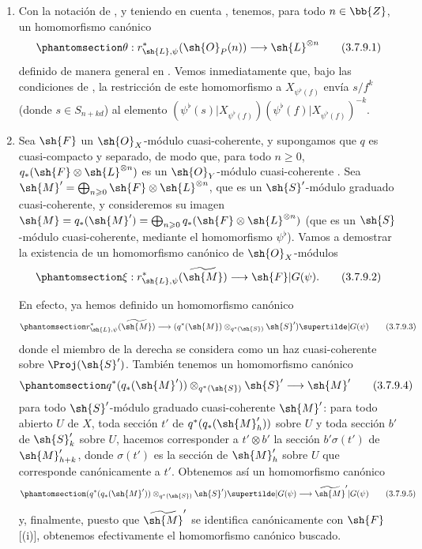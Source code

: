\documentclass[oneside,10pt]{amsart}
\makeatletter
\renewcommand{\geq}{\geqslant}
\newcommand{\ega@arrow}[2]{\mathchoice{#1}{#2}{#2}{#2}}
\renewcommand{\to}{\ega@arrow{\longrightarrow}{\rightarrow}}
\let\EGAOriginalLabel\label
\renewcommand{\label}[1]{\phantomsection\EGAOriginalLabel{#1}}
\makeatother
\begin{document}
\begin{remarks}[3.7.9]
\label{II.3.7.9}
\medskip\noindent
\begin{enumerate}
  \item[(i)] Con la notación de , y teniendo en cuenta , tenemos, para todo $n\in\bb{Z}$, un homomorfismo canónico
    \[
    \label{II.3.7.9.1}
      \theta : r_{\sh{L},\psi}^*(\sh{O}_P(n)) \to \sh{L}^{\otimes n}
    \tag{3.7.9.1}
    \]
    definido de manera general en .
    Vemos inmediatamente que, bajo las condiciones de , la restricción de este homomorfismo a $X_{\psi^\flat(f)}$ envía $s/f^k$ (donde $s\in S_{n+kd}$) al elemento $(\psi^\flat(s)|X_{\psi^\flat(f)})(\psi^\flat(f)|X_{\psi^\flat(f)})^{-k}$.
  \item[(ii)] Sea $\sh{F}$ un $\sh{O}_X$-módulo cuasi-coherente, y supongamos que $q$ es cuasi-compacto y separado, de modo que, para todo $n\geq0$, $q_*(\sh{F}\otimes\sh{L}^{\otimes n})$ es un $\sh{O}_Y$-módulo cuasi-coherente .
    Sea $\sh{M}'=\bigoplus_{n\geq0}\sh{F}\otimes\sh{L}^{\otimes n}$, que es un $\sh{S}'$-módulo graduado cuasi-coherente, y consideremos su imagen $\sh{M}=q_*(\sh{M}')=\bigoplus_{n\geq0}q_*(\sh{F}\otimes\sh{L}^{\otimes n})$ (que es un $\sh{S}$-módulo cuasi-coherente, mediante el homomorfismo $\psi^\flat$).
    Vamos a demostrar la existencia de un homomorfismo canónico de $\sh{O}_X$-módulos
    \[
    \label{II.3.7.9.2}
      \xi : r_{\sh{L},\psi}^*(\widetilde{\sh{M}}) \to \sh{F}|G(\psi).
    \tag{3.7.9.2}
    \]

    En efecto, ya hemos definido  un homomorfismo canónico
    \[
    \label{II.3.7.9.3}
      r_{\sh{L},\psi}^*(\widetilde{\sh{M}}) \to (q^*(\sh{M})\otimes_{q^*(\sh{S})}\sh{S}')\supertilde|G(\psi)
    \tag{3.7.9.3}
    \]
    donde el miembro de la derecha se considera como un haz cuasi-coherente sobre $\Proj(\sh{S}')$.
    También tenemos un homomorfismo canónico
    \[
    \label{II.3.7.9.4}
      q^*(q_*(\sh{M}'))\otimes_{q^*(\sh{S})}\sh{S}' \to \sh{M}'
    \tag{3.7.9.4}
    \]
    para todo $\sh{S}'$-módulo graduado cuasi-coherente $\sh{M}'$: para todo abierto $U$ de $X$, toda sección $t'$ de $q^*(q_*(\sh{M}'_h))$ sobre $U$ y toda sección $b'$ de $\sh{S}'_k$ sobre $U$, hacemos corresponder a $t'\otimes b'$ la sección $b'\sigma(t')$ de $\sh{M}'_{h+k}$, donde $\sigma(t')$ es la sección de $\sh{M}'_h$ sobre $U$ que corresponde canónicamente  a $t'$.
    Obtenemos así un homomorfismo canónico
    \[
    \label{II.3.7.9.5}
      (q^*(q_*(\sh{M}'))\otimes_{q^*(\sh{S})}\sh{S}')\supertilde|G(\psi) \to \widetilde{\sh{M}}'|G(\psi)
    \tag{3.7.9.5}
    \]
    y, finalmente, puesto que $\widetilde{\sh{M}}'$ se identifica canónicamente con $\sh{F}$ [(i)], obtenemos efectivamente el homomorfismo canónico buscado.


\end{enumerate}
\end{remarks}
\end{document}
